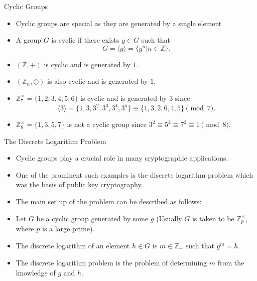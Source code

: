 \documentclass[ %
 10pt, xcolor={dvipsnames,svgnames,x11names,hyperref},
   hyperref={colorlinks=true,citecolor=green,linkcolor=DarkRed,urlcolor=ProcessBlue,anchorcolor=blue}
  ]{beamer}
\newenvironment{stepitemize}{\begin{itemize}[<+->]}{\end{itemize} }
\newcommand{\Z}{\mathbb{Z}}
\begin{document}
\begin{frame}{Cyclic Groups}
    \begin{stepitemize}
    \item Cyclic groups are special as they are generated by a single element
    \item A group $G$ is cyclic if there exists $g\in G$ such that 
$$G = \langle g\rangle = \{g^n|n\in \Z\}.$$
\item $(\Z,+)$ is cyclic and is generated by $1$.
    \item $(\Z_n, \oplus)$ is also cyclic and is generated by $1$.
    \item $\Z_7^{\times} = \{1,2,3,4,5,6\}$ is cyclic and is generated by $3$ since 
    $$\langle3\rangle = \{1,3,3^2, 3^3, 3^4, 3^5\} \equiv \{1,3,2,6,4,5\} \pmod{7}.$$
    \item $\Z_8^{\times} = \{1,3,5,7\}$ is not a cyclic group since $3^2\equiv 5^2\equiv 7^2\equiv 1 \pmod{8}$.
    \end{stepitemize}
\end{frame}

\begin{frame}{The Discrete Logarithm Problem}
    \begin{stepitemize}
    \item Cyclic groups play a crucial role in many cryptographic applications. 
    \item One of the prominent such examples is the discrete logarithm problem which was the basis of public key cryptography. 
    \item The main set up of the problem can be described as follows:

\item Let $G$ be a cyclic group generated by some $g$ (Usually $G$ is taken to be $\Z_p^{\times}$, where $p$ is a large prime). 
\item The discrete logarithm of an element $h\in G$ is $m\in \Z_+$ such that $g^m=h$. 
\item The discrete logarithm problem is the problem of determining $m$ from the knowledge of $g$ and $h$. 

    \end{stepitemize}
\end{frame}
\end{document}
